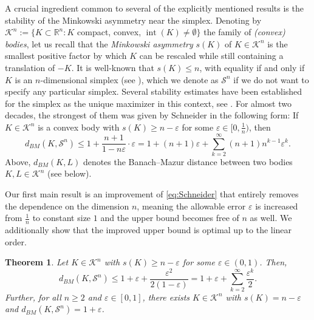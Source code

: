\documentclass{amsart}
\newtheorem{theorem}{Theorem}[section]
\newcommand{\cemph}[1]{\emph{\color{red}#1}}
\newcommand\R{\mathbb{R}}
\newcommand\CK{\mathcal{K}}
\DeclareMathOperator{\inte}{int}
\newcommand{\simplex}[1]{\mathcal{S}^{#1}}
\begin{document}
A crucial ingredient common to several of the explicitly mentioned results is the stability of the Minkowski asymmetry near the simplex.
Denoting by $\CK^n := \{ K \subset \R^n : K$ compact, convex, $ \inte(K) \neq \emptyset \}$ the family of \cemph{(convex) bodies},
let us recall that the \cemph{Minkowski asymmetry} $s(K)$ of $K \in \CK^n$
is the smallest positive factor by which $K$ can be rescaled while still containing a translation of $-K$.
It is well-known that $s(K) \leq n$, with equality if and only if $K$ is an $n$-dimensional simplex (see \cite{1963:Grunbaum}),
which we denote as $\simplex{n}$ if we do not want to specify any particular simplex.
Several stability estimates have been established for the simplex as the unique maximizer in this context, see \cite{2005:Böröczky,2005:Guo,2009:Schneider}.
For almost two decades, the strongest of them was given by Schneider
in the following form:
If $K \in \CK^n$ is a convex body with
$s(K) \geq n - \varepsilon$ for some $\varepsilon \in [0,\frac{1}{n})$,
then
\begin{equation}\label{eq:Schneider}
	d_{BM}(K,\simplex{n})
	\leq 1 + \frac{n+1}{1-n\varepsilon} \cdot \varepsilon = 1 + (n+1) \varepsilon + \sum_{k = 2}^\infty (n+1) n^{k-1} \varepsilon^k.
\end{equation}
Above,
$d_{BM}(K,L)$ denotes the Banach--Mazur distance between two bodies $K, L \in \CK^n$ (see below).


Our first main result is an improvement of \eqref{eq:Schneider} that entirely removes the dependence on the dimension $n$,
meaning the allowable error $\varepsilon$ is increased from $\frac{1}{n}$ to constant size $1$ and the upper bound becomes free of $n$ as well.
We additionally show that the improved upper bound is optimal up to the linear order.



\begin{theorem}\label{thm:main}
Let $K \in \CK^n$ with $s(K) \geq n-\varepsilon$ for some $\varepsilon \in (0,1)$.
Then,
\[
    d_{BM}(K,\simplex{n})
    \leq 1 + \varepsilon + \frac{\varepsilon^2}{2(1-\varepsilon)}
    = 1 + \varepsilon + \sum_{k = 2}^\infty \frac{\varepsilon^k}{2}.
\]
Further, for all $n \geq 2$ and $\varepsilon \in [0,1]$,
there exists $K \in \CK^n$ with $s(K) = n - \varepsilon$ and $d_{BM}(K,\simplex{n}) = 1 + \varepsilon$.
\end{theorem}
\end{document}
